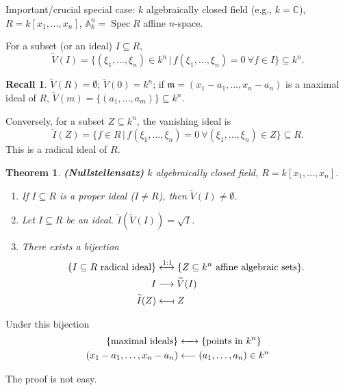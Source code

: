 \documentclass[12pt]{article}
\DeclareMathOperator{\Spec}{Spec}
\newtheorem*{theorem}{Theorem}
\theoremstyle{definition}
\newtheorem*{recall}{Recall}
\theoremstyle{remark}
\begin{document}
Important/crucial special case: $k$ algebraically closed field (e.g., $k=\mathbb{C}$), $R=k[x_1,\ldots,x_n]$, $\mathbb{A}_k^n=\Spec R$ affine $n$-space.

For a subset (or an ideal) $I\subseteq R$,
\[\widetilde{V}(I)=\big\{(\xi_1,\ldots,\xi_n)\in k^n\,\big|\,f(\xi_1,\ldots,\xi_n)=0\ \forall f\in I\big\}\subseteq k^n.\]

\begin{recall}
$\widetilde{V}(R)=\emptyset$; $\widetilde{V}(0)=k^n$; if $\mathfrak{m}=(x_1-a_1,\ldots,x_n-a_n)$ is a maximal ideal of $R$, $\widetilde{V}(m)=\{(a_1,\ldots,a_m)\}\subseteq k^n$.
\end{recall}

Conversely, for a subset $Z\subseteq k^n$, the vanishing ideal is
\[\widetilde{I}(Z)=\big\{f\in R\,\big|\,f(\xi_1,\ldots,\xi_n)=0\ \forall(\xi_1,\ldots,\xi_n)\in Z\big\}\subseteq R.\]
This is a radical ideal of $R$.

\begin{theorem}
\emph{\textbf{(Nullstellensatz)}} $k$ algebraically closed field, $R=k[x_1,\ldots,x_n]$.

\begin{enumerate}[label=\arabic*)]
\item If $I\subseteq R$ is a proper ideal ($I\neq R$), then $\widetilde{V}(I)\neq\emptyset$.

\item Let $I\subseteq R$ be an ideal. $\widetilde{I}(\widetilde{V}(I))=\sqrt{I}$.

\item There exists a bijection
\begin{align*}
\{I\subseteq R\text{ radical ideal}\}&\xleftrightarrow{1:1}\{Z\subseteq k^n\text{ affine algebraic sets}\}.\\
I&\longrightarrow\widetilde{V}(I)\\
\widetilde{I}(Z)&\longleftarrow\!\shortmid Z
\end{align*}
\end{enumerate}
\end{theorem}

Under this bijection
\begin{align*}
\{\text{maximal ideals}\}&\xleftrightarrow{\hspace{4.4mm}}\{\text{points in }k^n\}\\
(x_1-a_1,\ldots,x_n-a_n)&\longleftarrow(a_1,\ldots,a_n)\in k^n
\end{align*}

The proof is not easy.
\end{document}
